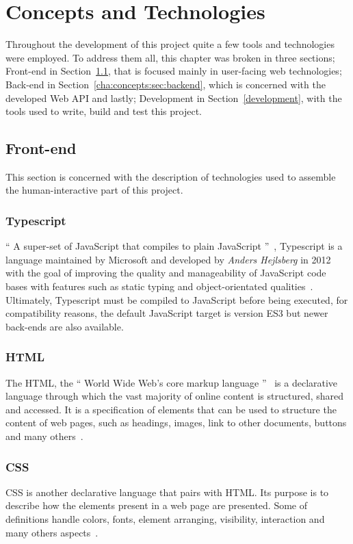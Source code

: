 \chapter{Concepts and Technologies}\label{cha:concepts}
Throughout the development of this project quite a few tools and technologies were employed. To address them all, this chapter was broken in three sections; Front-end in Section~\ref{cha:concepts:sec:frontend}, that is focused mainly in user-facing web technologies; Back-end in Section~\ref{cha:concepts:sec:backend}, which is concerned with the developed Web \gls{API} and lastly; Development in Section~\ref{development}, with the tools used to write, build and test this project.


\section{Front-end}\label{cha:concepts:sec:frontend}
This section is concerned with the description of technologies used to assemble the human-interactive part of this project.


\subsection{Typescript}
`` A super-set of JavaScript that compiles to plain JavaScript ''~\cite{tswebsite}, Typescript is a language maintained by Microsoft and developed by \textit{Anders Hejlsberg} in 2012 with the goal of improving the quality and manageability of JavaScript code bases with features such as static typing and object-orientated qualities~\cite{tsrevealed}. Ultimately, Typescript must be compiled to JavaScript before being executed, for compatibility reasons, the default JavaScript target is version ES3 but newer back-ends are also available.

\subsection{HTML}
The \gls{HTML}, the `` World Wide Web's core markup language ''~\cite{html} is a declarative language through which the vast majority of online content is structured, shared and accessed. It is a specification of elements that can be used to structure the content of web pages, such as headings, images, link to other documents, buttons and many others~\cite{htmlcss}.

\subsection{CSS}
\gls{CSS} is another declarative language that pairs with HTML. Its purpose is to describe how the elements present in a web page are presented.
Some of definitions handle colors, fonts, element arranging, visibility, interaction and many others aspects~\cite{htmlcss}.

